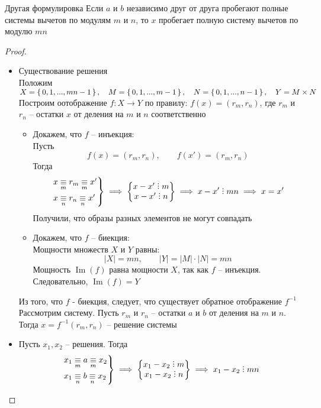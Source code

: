 \begin{undefthm}{Другая формулировка}
	Если $a$ и $b$ независимо друг от друга пробегают полные системы вычетов по модулям $m$ и $n$, то $x$ пробегает полную систему вычетов по модулю $mn$
\end{undefthm}

\begin{proof}
	\hfill
	\begin{itemize}
		\item Существование решения \\
		Положим $ X = \set{0, 1, ..., mn - 1}, \quad M = \set{0, 1, ..., m - 1}, \quad N = \set{0, 1, ..., n - 1}, \quad Y = M \times N $ \\
		Построим оотображение $f : X \to Y$ по правилу: $f(x) = (r_m, r_n)$, где $r_m$ и $r_n$ -- остатки $x$ от деления на $m$ и $n$ соответственно
		\begin{itemize}
			\item Докажем, что $f$ -- инъекция: \\
			Пусть
			$$ f(x) = (r_m, r_n), \qquad f(x') = (r_m, r_n) $$
			Тогда
			$$ \begin{rcases}
				x \comp{m} r_m \comp{m} x' \\
				x \comp{n} r_n \comp{n} x'
			   \end{rcases} \implies
			   \begin{Bmatrix}
				x - x' \divby m \\
				x - x' \divby n
			   \end{Bmatrix} \implies x - x' \divby mn \implies x = x' $$
			Получили, что образы разных элементов не могут совпадать
			\item Докажем, что $f$ -- биекция: \\
			Мощности множеств $X$ и $Y$ равны:
			$$ |X| = mn, \qquad |Y| = |M| \cdot |N| = mn $$
			Мощность $ \operatorname{Im}(f) $ равна мощности $X$, так как $f$ -- инъекция. Следовательно, $\operatorname{Im}(f) = Y $
		\end{itemize}
		Из того, что $f$ - биекция, следует, что существует обратное отображение $f^{-1}$ \\
		Рассмотрим систему. Пусть $r_m$ и $r_n$ -- остатки $a$ и $b$ от деления на $m$ и $n$. Тогда $x = f^{-1}(r_m, r_n)$ -- решение системы
		\item Пусть $x_1, x_2$ -- решения. Тогда
		$$ \begin{rcases}
			x_1 \comp{m} a \comp{m} x_2 \\
			x_1 \comp{n} b \comp{n} x_2
		   \end{rcases} \implies
		   \begin{Bmatrix}
		   	x_1 - x_2 \divby m \\
			x_1 - x_2 \divby n
		   \end{Bmatrix} \implies x_1 - x_2 \divby mn $$
	\end{itemize}
\end{proof}

